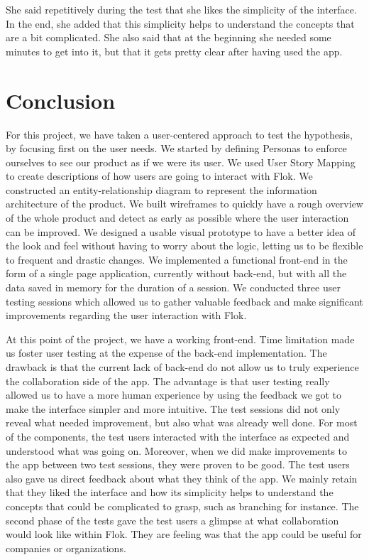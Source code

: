 \documentclass[a4paper,12pt, oneside]{article}
\begin{document}
She said repetitively during the test that she likes the simplicity of the interface.
In the end, she added that this simplicity helps to understand the concepts that are a bit complicated.
She also said that at the beginning she needed some minutes to get into it, but that it gets pretty clear after having used the app.

\section{Conclusion}

For this project, we have taken a user-centered approach to test the hypothesis, by focusing first on the user needs.
We started by defining Personas to enforce ourselves to see our product as if we were its user.
We used User Story Mapping to create descriptions of how users are going to interact with Flok.
We constructed an entity-relationship diagram to represent the information architecture of the product.
We built wireframes to quickly have a rough overview of the whole product and detect as early as possible where the user interaction can be improved.
We designed a usable visual prototype to have a better idea of the look and feel without having to worry about the logic, letting us to be flexible to frequent and drastic changes.
We implemented a functional front-end in the form of a single page application, currently without back-end, but with all the data saved in memory for the duration of a session.
We conducted three user testing sessions which allowed us to gather valuable feedback and make significant improvements regarding the user interaction with Flok.

At this point of the project, we have a working front-end.
Time limitation made us foster user testing at the expense of the back-end implementation.
The drawback is that the current lack of back-end do not allow us to truly experience the collaboration side of the app.
The advantage is that user testing really allowed us to have a more human experience by using the feedback we got to make the interface simpler and more intuitive.
The test sessions did not only reveal what needed improvement, but also what was already well done.
For most of the components, the test users interacted with the interface as expected and understood what was going on.
Moreover, when we did make improvements to the app between two test sessions, they were proven to be good.
The test users also gave us direct feedback about what they think of the app.
We mainly retain that they liked the interface and how its simplicity helps to understand the concepts that could be complicated to grasp, such as branching for instance.
The second phase of the tests gave the test users a glimpse at what collaboration would look like within Flok.
They are feeling was that the app could be useful for companies or organizations.
\end{document}
